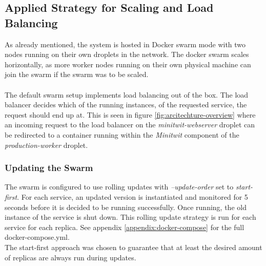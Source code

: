 \subsection{Applied Strategy for Scaling and Load Balancing}
As already mentioned, the system is hosted in Docker swarm mode with two nodes running on their own droplets in the network. The docker swarm scales horizontally, as more worker nodes running on their own physical machine can join the swarm if the swarm was to be scaled. \\
\\
The default swarm setup implements load balancing out of the box. The load balancer decides which of the running instances, of the requested service, the request should end up at\cite{docker-ingress}. This is seen in figure \ref{fig:arcitechture-overview} where an incoming request to the load balancer on the \textit{minitwit-webserver} droplet can be redirected to a container running within the \textit{Minitwit} component of the \textit{production-worker} droplet.

\subsubsection{Updating the Swarm}
The swarm is configured to use rolling updates with \textit{--update-order} set to \textit{start-first}. For each service, an updated version is instantiated and monitored for 5 seconds before it is decided to be running successfully. Once running, the old instance of the service is shut down. This rolling update strategy is run for each service for each replica. See appendix \ref{appendix:docker-compose} for the full docker-compose.yml.\\
The start-first approach was chosen to guarantee that at least the desired amount of replicas are always run during updates.